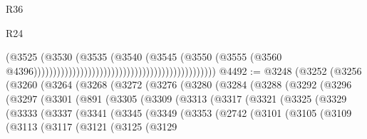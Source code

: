 \begin{lexlean}{R36}
\begin{lexlean}{R24}
\begin{coremodule}
{{{{{{{{{{{{{{{{{{{{{{{{{{{{{{{{{{{{{{{{{{{{{{{{{{{{{{{{{{{{{{{{{{{{{{{{{{{{{{{{{{{{{{{{{{{{{{{{{{{{{{{{{{{{{{{{{{{{{{{{{{{{{{{{{{{{{{{{{{{{{{{{{{{{{{{{{{{{{{{{{{{{{{{{{{{{{{{{{{{{{{{{{{{{{{{{{{{                                                                                  (@3525
                                                                                    (@3530
                                                                                      (@3535
                                                                                        (@3540
                                                                                          (@3545
                                                                                            (@3550
                                                                                              (@3555
                                                                                                (@3560
                                                                                                  @4396)))))))))))))))))))))))))))))))))))))))))))))))
@4492 := @3248
    (@3252
      (@3256
        (@3260
          (@3264
            (@3268
              (@3272
                (@3276
                  (@3280
                    (@3284
                      (@3288
                        (@3292
                          (@3296
                            (@3297
                              (@3301
                                (@891
                                  (@3305
                                    (@3309
                                      (@3313
                                        (@3317
                                          (@3321
                                            (@3325
                                              (@3329
                                                (@3333
                                                  (@3337
                                                    (@3341
                                                      (@3345
                                                        (@3349
                                                          (@3353
                                                            (@2742
                                                              (@3101
                                                                (@3105
                                                                  (@3109
                                                                    (@3113
                                                                      (@3117
                                                                        (@3121
                                                                          (@3125
                                                                            (@3129
}}}}}}}}}}}}}}}}}}}}}}}}}}}}}}}}}}}}}}}}}}}}}}}}}}}}}}}}}}}}}}}}}}}}}}}}}}}}}}}}}}}}}}}}}}}}}}}}}}}}}}}}}}}}}}}}}}}}}}}}}}}}}}}}}}}}}}}}}}}}}}}}}}}}}}}}}}}}}}}}}}}}}}}}}}}}}}}}}}}}}}}}}}}}}}}}}}}
\end{coremodule}
\end{lexlean}
\end{lexlean}
